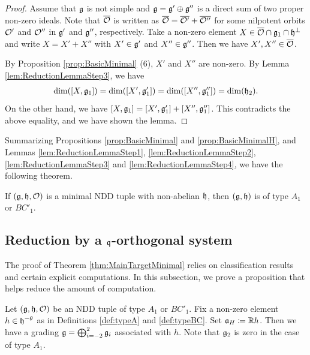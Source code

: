 \begin{proof}
	Assume that $\mathfrak{g}$ is not simple and $\mathfrak{g} = \mathfrak{g}' \oplus \mathfrak{g}''$ is a direct sum of two proper non-zero ideals.
	Note that $\overline{\mathcal{O}}$ is written as $\overline{\mathcal{O}} = \overline{\mathcal{O}'} + \overline{\mathcal{O}''}$ for some nilpotent orbits $\mathcal{O}'$ and $\mathcal{O}''$ in $\mathfrak{g}'$ and $\mathfrak{g}''$, respectively.
	Take a non-zero element $X \in \overline{\mathcal{O}} \cap \mathfrak{g}_1 \cap \mathfrak{h}^\perp$ and write $X = X' + X''$ with $X' \in \mathfrak{g}'$ and $X'' \in \mathfrak{g}''$.
	Then we have $X', X'' \in \overline{\mathcal{O}}$.

	By Proposition \ref{prop:BasicMinimal} (6), $X'$ and $X''$ are non-zero.
	By Lemma \ref{lem:ReductionLemmaStep3}, we have
	\begin{align*}
		\dim([X, \mathfrak{g}_1]) = \dim([X', \mathfrak{g}'_1]) = \dim([X'', \mathfrak{g}''_1]) = \dim(\mathfrak{h}_2).
	\end{align*}
	On the other hand, we have $[X, \mathfrak{g}_1] = [X', \mathfrak{g}'_1] + [X'', \mathfrak{g}''_1]$.
	This contradicts the above equality, and we have shown the lemma.
\end{proof}

Summarizing Propositions \ref{prop:BasicMinimal} and \ref{prop:BasicMinimalH}, and Lemmas \ref{lem:ReductionLemmaStep1}, \ref{lem:ReductionLemmaStep2}, \ref{lem:ReductionLemmaStep3} and \ref{lem:ReductionLemmaStep4}, we have the following theorem.

\begin{theorem} \label{thm:ReductionLemma}
	If $(\mathfrak{g}, \mathfrak{h}, \mathcal{O})$ is a minimal NDD tuple with non-abelian $\mathfrak{h}$, then $(\mathfrak{g}, \mathfrak{h})$ is of type $A_1$ or $BC'_1$.
\end{theorem}

\subsection{Reduction by a \texorpdfstring{$\mathfrak{q}$}{q}-orthogonal system} \label{subsect:ReductionStronglyOrthogonal}

The proof of Theorem \ref{thm:MainTargetMinimal} relies on classification results and certain explicit computations.
In this subsection, we prove a proposition that helps reduce the amount of computation.

Let $(\mathfrak{g}, \mathfrak{h}, \mathcal{O})$ be an NDD tuple of type $A_1$ or $BC'_1$.
Fix a non-zero element $h \in \mathfrak{h}^{-\theta}$ as in Definitions \ref{def:typeA} and \ref{def:typeBC}.
Set $\mathfrak{a}_H \coloneq \mathbb{R} h$.
Then we have a grading $\mathfrak{g} = \bigoplus_{i=-2}^2 \mathfrak{g}_i$ associated with $h$.
Note that $\mathfrak{g}_2$ is zero in the case of type $A_1$.

